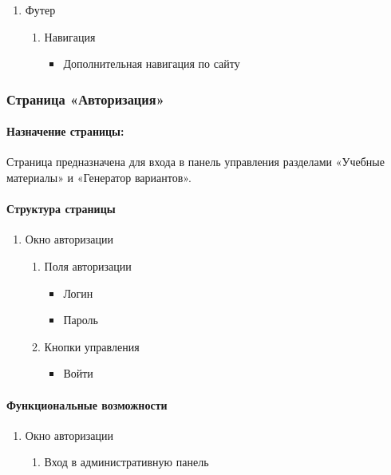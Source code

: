 \begin{enumerate}
	\item Футер
	\begin{enumerate}
		\item Навигация
		\begin{itemize}
			\item Дополнительная навигация по сайту
		\end{itemize}
	\end{enumerate}
\end{enumerate}


\subsubsection{Страница «Авторизация»}
\paragraph{Назначение страницы:} Страница предназначена для входа в панель управления разделами «Учебные материалы» и «Генератор вариантов».

\paragraph{Структура страницы}
\begin{enumerate}
	\item Окно авторизации
	\begin{enumerate}
		\item Поля авторизации
		\begin{itemize}
		\item Логин
		\item Пароль
		\end{itemize}
		\item Кнопки управления
		\begin{itemize}
		\item Войти
		\end{itemize}
	\end{enumerate}
\end{enumerate}

\paragraph{Функциональные возможности}
\begin{enumerate}
	\item Окно авторизации
	\begin{enumerate}
		\item Вход в административную панель
	\end{enumerate}
\end{enumerate}


